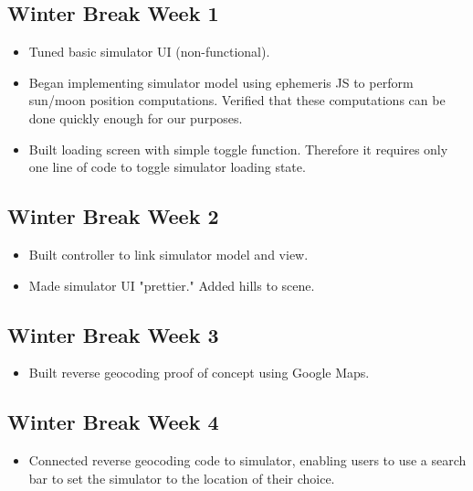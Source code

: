 \documentclass[10pt, onecolumn, draftclsnofoot, letterpaper, compsoc]{IEEEtran}
\begin{document}
\subsection{Winter Break Week 1}

    \begin{itemize}

    \item Tuned basic simulator UI (non-functional).

	\item Began implementing simulator model using ephemeris JS to perform sun/moon
		  position computations. Verified that these computations can be done
		  quickly enough for our purposes.

	\item Built loading screen with simple toggle function. Therefore it requires only
		  one line of code to toggle simulator loading state.

    \end{itemize}

\subsection{Winter Break Week 2}

    \begin{itemize}

    \item Built controller to link simulator model and view.

	\item Made simulator UI "prettier." Added hills to scene.

    \end{itemize}

\subsection{Winter Break Week 3}

    \begin{itemize}

    \item Built reverse geocoding proof of concept using Google Maps.

    \end{itemize}

\subsection{Winter Break Week 4}

    \begin{itemize}

    \item Connected reverse geocoding code to simulator, enabling users to use a search
	      bar to set the simulator to the location of their choice.

    \end{itemize}
\end{document}
